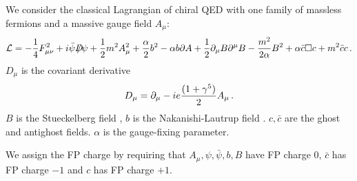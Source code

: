 \documentclass[a4paper,11pt]{article}
\def\slshD{D \! \! \! \! \slash}
\begin{document}
We consider the classical Lagrangian of chiral QED with
one family of massless fermions and a massive gauge field $A_\mu$:
%
\begin{eqnarray}
{\cal L}=  
-{1 \over 4} F_{\mu\nu}^2 +
i \bar \psi \slshD \psi 
+ {1 \over 2} m^2 A_\mu^2 
+ {\alpha \over 2} b^2 - \alpha b \partial A 
+ {1 \over 2} \partial_\mu B \partial^\mu B
- {m^2 \over 2 \alpha} B^2  + \alpha \bar c \square c 
+ m^2 \bar c c
\, .
\label{sez2.1}
\end{eqnarray}
%
$D_\mu$ is the covariant derivative
%
\begin{eqnarray}
D_\mu = \partial_\mu - i e {(1 + \gamma^5) \over 2} A_\mu \, .
\label{sez2.2}
\end{eqnarray}
%
$B$ is the Stueckelberg field \cite{stueckelberg},
 $b$ is the Nakanishi-Lautrup field
\cite{nakanishi}.
$c, \bar c$ are the ghost and antighost fields.
$\alpha$ is the gauge-fixing parameter.

We assign the FP charge by requiring that $A_\mu, \psi, \bar \psi,b,B$
have FP charge $0$, $\bar c$ has FP charge $-1$ and $c$
has FP charge $+1$. 
\end{document}
